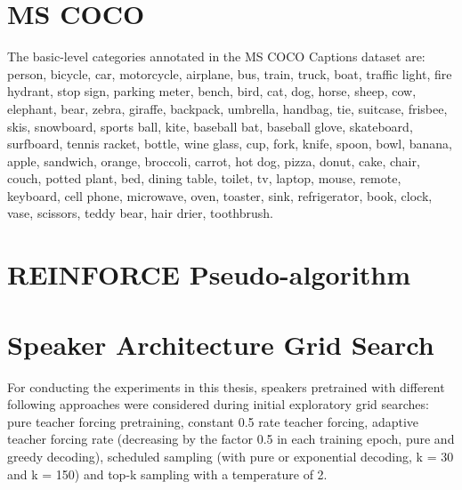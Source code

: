 \section{MS COCO}

The basic-level categories annotated in the MS COCO Captions dataset are: person, bicycle, car, motorcycle, airplane, bus, train, truck, boat, traffic light, fire hydrant, stop sign, parking meter, bench, bird, cat, dog, horse, sheep, cow, elephant, bear, zebra, giraffe, backpack, umbrella, handbag, tie, suitcase, frisbee, skis, snowboard, sports ball, kite, baseball bat, baseball glove, skateboard, surfboard, tennis racket, bottle, wine glass, cup, fork, knife, spoon, bowl, banana, apple, sandwich, orange, broccoli, carrot, hot dog, pizza, donut, cake, chair, couch, potted plant, bed, dining table, toilet, tv, laptop, mouse, remote, keyboard, cell phone, microwave, oven, toaster, sink, refrigerator, book, clock, vase, scissors, teddy bear, hair drier, toothbrush.


\section{REINFORCE Pseudo-algorithm}

\section{Speaker Architecture Grid Search}
\label{app:grid_search}

For conducting the experiments in this thesis, speakers pretrained with different following approaches were considered during initial exploratory grid searches: pure teacher forcing pretraining, constant 0.5 rate teacher forcing, adaptive teacher forcing rate (decreasing by the factor 0.5 in each training epoch, pure and greedy decoding), scheduled sampling (with pure or exponential decoding, k = 30 and k = 150) and top-k sampling with a temperature of 2.